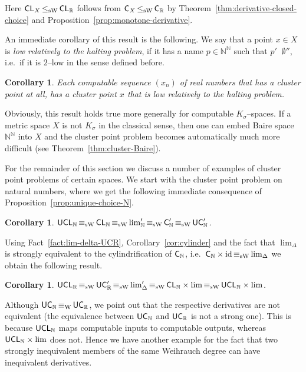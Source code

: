 \documentclass[a4paper]{amsart}
\def\IN{{\mathbb{N}}}
\def\IR{{\mathbb{R}}}
\def\id{{\rm id}}
\def\C{\mbox{\rm\sffamily C}}
\def\UC{\mbox{\rm\sffamily UC}}
\def\CL{\text{\rm\sffamily CL}}
\def\UCL{\text{\rm\sffamily UCL}}
\def\leqT{\mathop{\leq_{\mathrm{T}}}}
\def\equivW{\mathop{\equiv_{\mathrm{W}}}}
\def\leqSW{\mathop{\leq_{\mathrm{sW}}}}
\def\equivSW{\mathop{\equiv_{\mathrm{sW}}}}
\newtheorem{corollary}[theorem]{Corollary}
\theoremstyle{definition}
\begin{document}
Here $\CL_X\leqSW\CL_\IR$ follows from $\C_X\leqSW\C_\IR$ by Theorem~\ref{thm:derivative-closed-choice}
and Proposition~\ref{prop:monotone-derivative}.

An immediate corollary of this result is the following. We say that a point $x\in X$
is {\em low relatively to the halting problem}, if it has a name $p\in\IN^\IN$ such that
$p'\leqT\emptyset''$, i.e.\ if it is $2$--low in the sense defined before.

\begin{corollary}
\label{cor:cluster-low-point}
Each computable sequence $(x_n)$ of real numbers that has a cluster point at all,
has a cluster point $x$ that is low relatively to the halting problem.
\end{corollary}

Obviously, this result holds true more generally for computable $K_\sigma$--spaces.
If a metric space $X$ is not $K_\sigma$ in the classical sense, then one can embed Baire space $\IN^\IN$
into $X$ and the cluster point problem becomes automatically much more difficult (see Theorem~\ref{thm:cluster-Baire}).

For the remainder of this section we discuss a number of examples of cluster point problems of certain spaces. 
We start with the cluster point problem on natural numbers, where we get the following
immediate consequence of Proposition~\ref{prop:unique-choice-N}.

\begin{corollary}
\label{cor:unique-discrete-cluster}
$\UCL_\IN\equivSW\CL_\IN\equivSW\lim_\IN'\equivSW\C_\IN'\equivSW\UC_\IN'$.
\end{corollary}

Using Fact~\ref{fact:lim-delta-UCR}, Corollary~\ref{cor:cylinder} and the fact that
$\lim_\Delta$ is strongly equivalent to the cylindrification of $\C_\IN$, i.e.\ $\C_\IN\times\id\equivSW\lim_\Delta$
we obtain the following result.

\begin{corollary}
\label{cor:unique-cluster-reals}
$\UCL_\IR\equivSW\UC_\IR'\equivSW\lim_\Delta'\equivSW\CL_\IN\times\lim\equivSW\UCL_\IN\times\lim$.
\end{corollary}

Although $\UC_\IN\equivW\UC_\IR$, we point out that the respective derivatives are
not equivalent (the equivalence between $\UC_\IN$ and $\UC_\IR$ is not a strong one).
This is because $\UCL_\IN$ maps computable inputs to computable outputs, whereas $\UCL_\IN\times\lim$
does not.
Hence we have another example for the fact that two strongly inequivalent members
of the same Weihrauch degree can have inequivalent derivatives.
\end{document}
